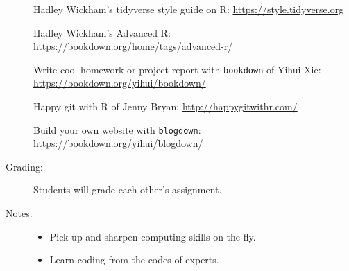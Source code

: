 \documentclass[11pt]{article}
\begin{document}
\begin{description}
Hadley Wickham's tidyverse style guide on R:
\url{https://style.tidyverse.org}

Hadley Wickham's Advanced R:
\url{https://bookdown.org/home/tags/advanced-r/}
  
Write cool homework or project report with \texttt{bookdown} of Yihui Xie:
\url{https://bookdown.org/yihui/bookdown/}

Happy git with R of Jenny Bryan:
\url{http://happygitwithr.com/}

Build your own website with \texttt{blogdown}:
\url{https://bookdown.org/yihui/blogdown/}


\item[Grading:] Students will grade each other's assignment.

\item[Notes:] 
  \begin{itemize}
  \item Pick up and sharpen computing skills on the fly. %
  \item Learn coding from the codes of experts. %
  \end{itemize}

\end{description}
\end{document}
